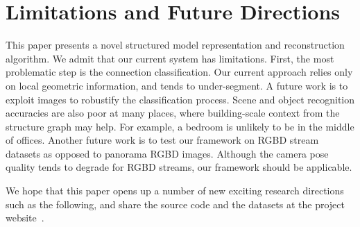 \section{Limitations and Future Directions}

This paper presents a novel structured model representation and
reconstruction algorithm.
We admit that our current system has limitations. First, the most
problematic step is the connection classification. Our current approach
relies only on local geometric information, and tends to under-segment.
A future work is to exploit images to robustify the classification
process. Scene and object recognition accuracies are also poor at many
places, where building-scale context from the structure graph may
help. For example, a bedroom is unlikely to be in the middle of offices.
Another future work is to test our framework on RGBD stream datasets as
opposed to panorama RGBD images. Although the camera pose quality tends
to degrade for RGBD streams, our framework should be applicable.

We hope that
this paper opens up a number of new exciting research directions such as
the following, and share the source code and the datasets at the project
website~\cite{SIMProject}.

